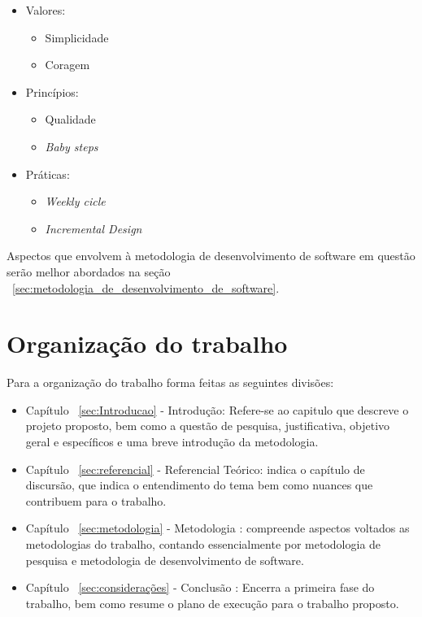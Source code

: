\begin{itemize}
   \item Valores:
   \begin{itemize}
       \item Simplicidade
       \item Coragem
    \end{itemize}
    \item Princípios:
    \begin{itemize}
       \item Qualidade
       \item \textit{Baby steps}
    \end{itemize}
    \item Práticas:
    \begin{itemize}
       \item \textit{Weekly cicle}
       \item \textit{Incremental Design}
    \end{itemize}
\end{itemize}

 
Aspectos que envolvem à metodologia de desenvolvimento de software em questão serão melhor abordados na seção ~\ref{sec:metodologia_de_desenvolvimento_de_software}.

\section{Organização do trabalho}

Para a organização do trabalho forma feitas as seguintes divisões:

\begin{itemize}
   \item Capítulo ~\ref{sec:Introducao} - Introdução: Refere-se ao capitulo que descreve o projeto proposto, bem como a questão de pesquisa, justificativa, objetivo geral e específicos e uma breve introdução da metodologia.
   \item Capítulo ~\ref{sec:referencial} - Referencial Teórico: indica o capítulo de  discursão, que indica o entendimento do tema bem como nuances que contribuem para o trabalho.
   \item Capítulo ~\ref{sec:metodologia} - Metodologia : compreende aspectos voltados as metodologias do trabalho, contando essencialmente por metodologia de pesquisa e metodologia de desenvolvimento de software.
   \item Capítulo ~\ref{sec:considerações} - Conclusão : Encerra a primeira fase do trabalho, bem como resume o plano de execução para o trabalho proposto.
\end{itemize}